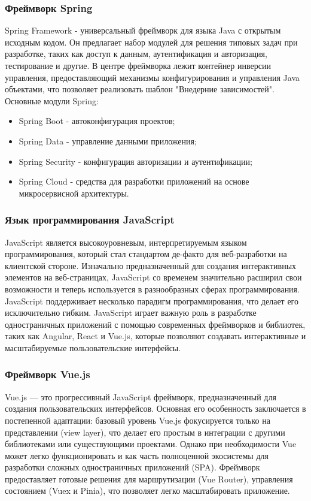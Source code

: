 \subsubsection{Фреймворк Spring}

Spring Framework - универсальный фреймворк для языка Java с открытым исходным кодом. Он предлагает набор модулей для решения типовых задач при разработке, таких как доступ к данным, аутентификация и авторизация, тестирование и другие. В центре фреймворка лежит контейнер инверсии управления, предоставляющий механизмы конфигурирования и управления Java объектами, что позволяет реализовать шаблон "Внедерние зависимостей"\cite{springboot}.
Основные модули Spring:
\begin{itemize}
	\item Spring Boot - автоконфигурация проектов;
	\item Spring Data - управление данными приложения\cite{persist};
	\item Spring Security - конфигурация авторизации и аутентификации;
	\item Spring Cloud - средства для разработки приложений на основе микросервисной архитектуры\cite{springcloud}.
\end{itemize}

\subsubsection{Язык программирования JavaScript}

JavaScript является высокоуровневым, интерпретируемым языком программирования, который стал стандартом де-факто для веб-разработки на клиентской стороне\cite{js}. Изначально предназначенный для создания интерактивных элементов на веб-страницах, JavaScript со временем значительно расширил свои возможности и теперь используется в разнообразных сферах программирования. JavaScript поддерживает несколько парадигм программирования, что делает его исключительно гибким. 
JavaScript играет важную роль в разработке одностраничных приложений с помощью современных фреймворков и библиотек, таких как Angular, React и Vue.js, которые позволяют создавать интерактивные и масштабируемые пользовательские интерфейсы.

\subsubsection{Фреймворк Vue.js}

Vue.js — это прогрессивный JavaScript фреймворк, предназначенный для создания пользовательских интерфейсов. Основная его особенность заключается в постепенной адаптации: базовый уровень Vue.js фокусируется только на представлении (view layer), что делает его простым в интеграции с другими библиотеками или существующими проектами. Однако при необходимости Vue может легко функционировать и как часть полноценной экосистемы для разработки сложных одностраничных приложений (SPA)\cite{vue}. Фреймворк предоставляет готовые решения для маршрутизации (Vue Router), управления состоянием (Vuex и Pinia), что позволяет легко масштабировать приложение.

